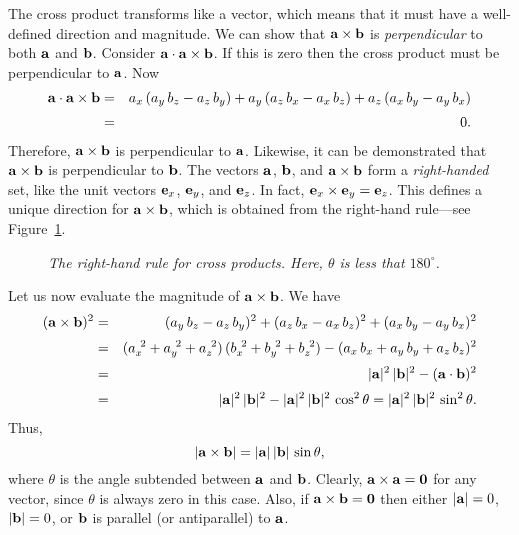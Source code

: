 The cross product  transforms like a vector, which
means that it must have  a well-defined direction and magnitude. We can show
that ${\bf a}\times{\bf b}$ is {\em perpendicular} to both ${\bf a}$ and ${\bf b}$.
Consider ${\bf a}\cdot {\bf a}\times{\bf b}$. If this is zero then the cross product
must be perpendicular to ${\bf a}$. Now
\begin{eqnarray}
{\bf a}\cdot {\bf a}\times{\bf b} &= &a_x\,(a_y\, b_z-a_z\, b_y) + a_y\, (a_z\, b_x- a_x \,b_z)
+a_z\,(a_x \,b_y - a_y\, b_x)\nonumber\\[0.5ex]
&=& 0.
\end{eqnarray}
Therefore, ${\bf a}\times {\bf b}$ is perpendicular to ${\bf a}$. Likewise, it can
be demonstrated that ${\bf a}\times{\bf b}$ is perpendicular to ${\bf b}$. 
The vectors $\bf a$, $\bf b$, and ${\bf a}\times{\bf b}$ form a {\em right-handed}
set, like the unit vectors ${\bf e}_x$, ${\bf e}_y$, and ${\bf e}_z$. In fact,  ${\bf e}_x\times
{\bf e}_y={\bf e}_z$. This defines a unique direction for ${\bf a}\times{\bf b}$, which
is obtained from the right-hand rule---see Figure~\ref{f6}.
\begin{figure}
\epsfysize=1.5in
\centerline{}
\caption{\em The right-hand rule for cross products. Here, $\theta$ is less that $180^\circ$.}\label{f6}
\end{figure}

Let us now evaluate the magnitude of ${\bf a}\times {\bf b}$. We have
\begin{eqnarray}
({\bf a}\times{\bf b})^2 &=& (a_y \,b_z-a_z\, b_y)^2 +(a_z \,b_x - a_x\, b_z)^2 +(a_x \,b_y
-a_y \,b_x)^2\nonumber\\[0.5ex]
&=& (a_x^{~2}+a_y^{~2}+a_z^{~2})\,(b_x^{~2}+b_y^{~2}+b_z^{~2}) -
(a_x\, b_x + a_y \,b_y + a_z\, b_z)^2\nonumber\\[0.5ex]
&=& |{\bf a}|^2 \,|{\bf b}|^2 - ({\bf a}\cdot {\bf b})^2\nonumber\\[0.5ex]
&=& |{\bf a}|^2 \,|{\bf b}|^2 - |{\bf a}|^2 \,|{\bf b}|^2 \,\cos^2\theta = |{\bf a}|^2\,|{\bf b}|^2\, \sin^2\theta.
\end{eqnarray}
Thus,
\begin{equation}
|{\bf a}\times{\bf b}| = |{\bf a}|\,|{\bf b}|\,\sin\theta,
\end{equation}
where $\theta$ is the angle subtended between ${\bf a}$ and ${\bf b}$.
Clearly, ${\bf a}\times{\bf a} = {\bf 0}$ for any vector, since $\theta$ is always
zero in this case. Also, if ${\bf a}\times{\bf b} = {\bf 0}$ then either
$|{\bf a}|=0$, $|{\bf b}|=0$, or ${\bf b}$ is parallel (or antiparallel) to ${\bf a}$.


